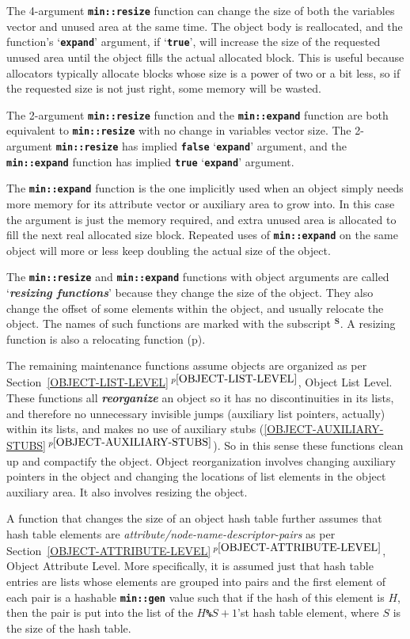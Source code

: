 \documentclass[12pt]{article}
\makeatletter
\newcommand{\TT}[1]{{\tt \bfseries #1}}
\newcommand{\skey}[2]{{\bf \em #1#2}\index{#1}}
\newcommand{\ikey}[2]{{\bf \em #1}\index{#2}}
\newcommand{\subsmkey}[2]{$\mathbf{^{#1}}$\index{#1@$^{#1}$!#2}}
\newcommand{\itemref}[1]{\ref{#1}$\,^{p\pageref{#1}}$}
\newcommand{\pagref}[1]{p\pageref{#1}}
\newcommand{\EOL}{\penalty \exhyphenpenalty}
\makeatother
\begin{document}
The 4-argument \TT{min::resize} function can change
the size of both the variables vector and unused area at the same
time.  The object body is reallocated, and the function's
`\TT{expand}' argument, if `\TT{true}', will increase
the size of the requested unused area until the object fills
the actual allocated block.  This is useful because allocators
typically allocate blocks whose size is a power of two or
a bit less, so if the requested size is not just right, some
memory will be wasted.

The 2-argument \TT{min::resize} function and the \TT{min::\EOL expand}
function are both equivalent to \TT{min::\EOL resize} with no change
in variables vector size.  The 2-argument \TT{min::\EOL resize}
has implied \TT{false} `\TT{expand}' argument, and the
\TT{min::\EOL expand} function has implied \TT{true} `\TT{expand}'
argument.

The \TT{min::expand} function is the one implicitly used when an object simply
needs more memory for its attribute vector or auxiliary area to grow into.
In this case the argument is just the memory required, and extra unused
area is allocated to fill the next real allocated size block.  Repeated
uses of \TT{min::expand} on the same object will more or less keep
doubling the actual size of the object.

The \TT{min::resize} and \TT{min::expand} functions with object arguments
are called `\skey{resizing function}s'\label{RESIZING-FUNCTIONS}
because they change the size of the object.  They also change
the offset of some elements within the object, and usually
relocate the object.
The names of such functions are marked with the subscript
\subsmkey{S}{of function}.  A resizing function is also
a relocating function (\pagref{RELOCATING-FUNCTIONS}).

The remaining maintenance functions assume objects are organized
as per Section~\itemref{OBJECT-LIST-LEVEL}, Object List Level.
These functions all \ikey{reorganize}{object}
an object so it has no discontinuities
in its lists, and therefore no unnecessary invisible jumps (auxiliary
list pointers, actually) within its lists, and makes no use of
auxiliary stubs (\itemref{OBJECT-AUXILIARY-STUBS}).  So in this
sense these functions clean up and compactify the object.  Object
reorganization involves changing auxiliary pointers in the object and
changing the locations of list elements in the object auxiliary area.
It also involves resizing the object.

A function that changes the size of an object hash table further
assumes that hash table elements are {\em attribute/node-name-descriptor-pairs}
as per Section~\itemref{OBJECT-ATTRIBUTE-LEVEL}, Object Attribute Level.
More specifically, it is assumed just that hash table entries are lists
whose elements are grouped into pairs and the first element of each
pair is a hashable \TT{min::gen} value such that if the hash of this
element is $H$, then the pair is put into the list of the $H$\TT{\%}$S+1$'st
hash table element, where $S$ is the size of the hash table.
\end{document}
